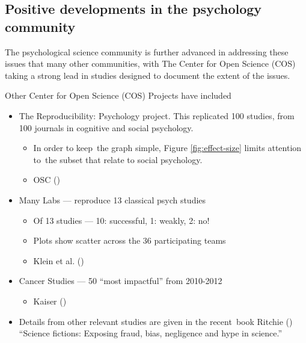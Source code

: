 \documentclass[
  10ptls,
  b5paper]{book}
\providecommand{\tightlist}{%
  \setlength{\itemsep}{0pt}\setlength{\parskip}{0pt}}
\begin{document}
\subsection*{Positive developments in the psychology community}\label{positive-developments-in-the-psychology-community}

The psychological science community is further advanced in
addressing these issues that many other communities, with
The Center for Open Science (COS) taking a strong lead in
studies designed to document the extent of the issues.

Other Center for Open Science (COS) Projects have included

\begin{itemize}
\tightlist
\item
  The Reproducibility: Psychology project. This replicated
  100 studies, from 100 journals in cognitive and social
  psychology.

  \begin{itemize}
  \tightlist
  \item
    In order to keep~the graph simple, Figure
    \ref{fig:effect-size} limits attention to~the
    subset that relate to social psychology.
  \item
    OSC ()
  \end{itemize}
\item
  Many Labs --- reproduce 13 classical psych studies

  \begin{itemize}
  \tightlist
  \item
    Of 13 studies --- 10: successful, 1: weakly, 2: no!
  \item
    Plots show scatter across the 36 participating teams
  \item
    Klein et al. ()
  \end{itemize}
\item
  Cancer Studies --- 50 ``most impactful'' from 2010-2012

  \begin{itemize}
  \tightlist
  \item
    Kaiser ()
  \end{itemize}
\item
  Details from other relevant studies are given in the
  recent~book Ritchie () ``Science fictions: Exposing
  fraud, bias, negligence and hype in science.''
\end{itemize}
\end{document}
